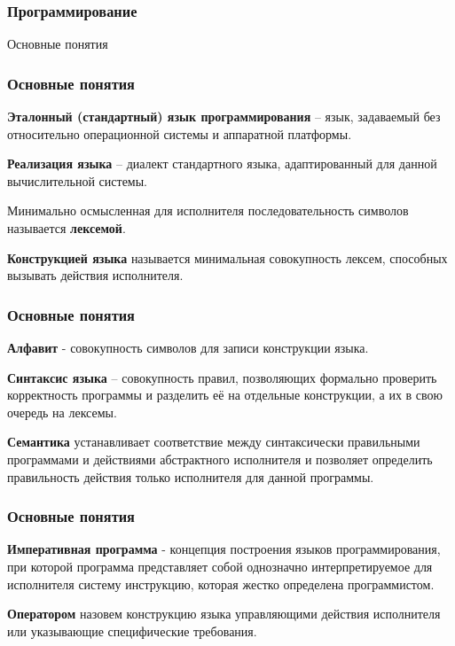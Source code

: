 \subtitle{Лекция 9 --- Программирование: Основные понятия}

\frame[plain]
{\titlepage}	%


\begin{frame}
\frametitle{Программирование}

\begin{center}

\Huge
Основные понятия
	
\end{center}
\end{frame}

	\begin{frame}
\frametitle{Основные понятия}

\textbf{Эталонный (стандартный) язык программирования} – язык, задаваемый без относительно операционной системы и аппаратной платформы.

\textbf{Реализация языка} – диалект стандартного языка, адаптированный для данной вычислительной системы.

Минимально осмысленная для исполнителя последовательность символов называется \textbf{лексемой}.

\textbf{Конструкцией языка} называется минимальная совокупность лексем, способных вызывать действия исполнителя.

\end{frame}

	\begin{frame}
\frametitle{Основные понятия}

\textbf{Алфавит} - совокупность символов для записи конструкции языка.

\textbf{Синтаксис языка} – совокупность правил, позволяющих формально проверить корректность программы и разделить её на отдельные конструкции, а их в свою очередь на лексемы.

\textbf{Семантика} устанавливает соответствие между синтаксически правильными программами и действиями абстрактного исполнителя и позволяет определить правильность действия только исполнителя для данной программы.

\end{frame}

	\begin{frame}
\frametitle{Основные понятия}

\textbf{Императивная программа} - концепция построения языков программирования, при которой программа представляет собой однозначно интерпретируемое для исполнителя систему инструкцию, которая жестко определена программистом.

\textbf{Оператором} назовем конструкцию языка управляющими действия исполнителя или указывающие специфические требования.





\end{frame}

